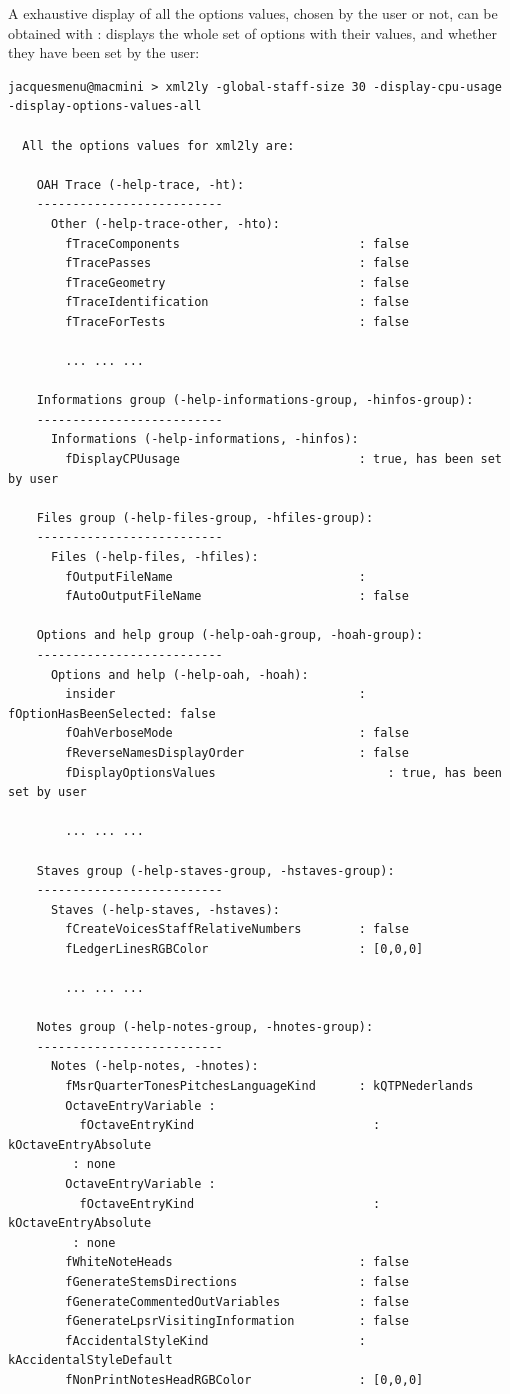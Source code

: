 A exhaustive display of all the options values, chosen by the user or not, can be obtained with :
displays the whole set of options with their values, and whether they have been set by the user:
\begin{lstlisting}[language=Terminal]
jacquesmenu@macmini > xml2ly -global-staff-size 30 -display-cpu-usage -display-options-values-all

  All the options values for xml2ly are:

    OAH Trace (-help-trace, -ht):
    --------------------------
      Other (-help-trace-other, -hto):
        fTraceComponents                         : false
        fTracePasses                             : false
        fTraceGeometry                           : false
        fTraceIdentification                     : false
        fTraceForTests                           : false

		... ... ...

    Informations group (-help-informations-group, -hinfos-group):
    --------------------------
      Informations (-help-informations, -hinfos):
        fDisplayCPUusage                         : true, has been set by user

    Files group (-help-files-group, -hfiles-group):
    --------------------------
      Files (-help-files, -hfiles):
        fOutputFileName                          :
        fAutoOutputFileName                      : false

    Options and help group (-help-oah-group, -hoah-group):
    --------------------------
      Options and help (-help-oah, -hoah):
        insider                                  : fOptionHasBeenSelected: false
        fOahVerboseMode                          : false
        fReverseNamesDisplayOrder                : false
        fDisplayOptionsValues                        : true, has been set by user

		... ... ...

    Staves group (-help-staves-group, -hstaves-group):
    --------------------------
      Staves (-help-staves, -hstaves):
        fCreateVoicesStaffRelativeNumbers        : false
        fLedgerLinesRGBColor                     : [0,0,0]

		... ... ...

    Notes group (-help-notes-group, -hnotes-group):
    --------------------------
      Notes (-help-notes, -hnotes):
        fMsrQuarterTonesPitchesLanguageKind      : kQTPNederlands
        OctaveEntryVariable :
          fOctaveEntryKind                         : kOctaveEntryAbsolute
         : none
        OctaveEntryVariable :
          fOctaveEntryKind                         : kOctaveEntryAbsolute
         : none
        fWhiteNoteHeads                          : false
        fGenerateStemsDirections                 : false
        fGenerateCommentedOutVariables           : false
        fGenerateLpsrVisitingInformation         : false
        fAccidentalStyleKind                     : kAccidentalStyleDefault
        fNonPrintNotesHeadRGBColor               : [0,0,0]


\end{lstlisting}
